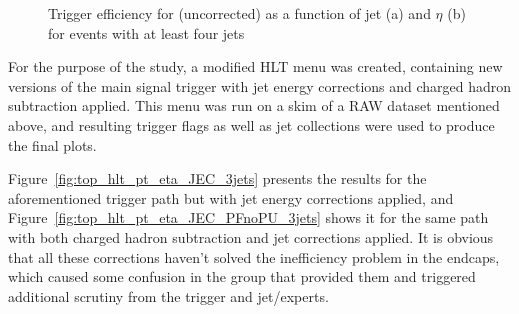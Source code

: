 \begin{figure}[hbtp]
    \centering
{}
\hfill
{}
\caption[Trigger efficiency for \HLTThreeCentralPFJet as a function of jet \pt and $\eta$]{Trigger efficiency for
\HLTThreeCentralPFJet (uncorrected) as a function of jet \pt (a) and $\eta$ (b) for events with at least four jets}
\label{fig:top_hlt_pt_eta_4jets} 
\end{figure}


For the purpose of the study, a modified HLT menu was created, containing new versions of the main signal trigger with
jet energy corrections and charged hadron subtraction applied. This menu was run on a \ttbar skim of a RAW dataset
mentioned above, and resulting trigger flags as well as jet collections were used to produce the final plots.

Figure~\ref{fig:top_hlt_pt_eta_JEC_3jets} presents the results for the aforementioned trigger path but with jet energy
corrections applied, and Figure~\ref{fig:top_hlt_pt_eta_JEC_PFnoPU_3jets} shows it for the same path with both charged
hadron subtraction and jet corrections applied. It is obvious that all these corrections haven't solved the inefficiency
problem in the endcaps, which caused some confusion in the group that provided them and triggered additional scrutiny
from the trigger and jet/\MET experts.

